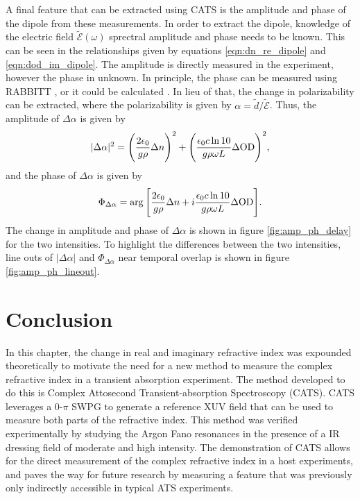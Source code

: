 A final feature that can be extracted using CATS is the amplitude and phase of the dipole from these measurements.  In order to extract the dipole, knowledge of the electric field $\tilde{\mathcal{E}}(\omega)$ sprectral amplitude and phase needs to be known.  This can be seen in the relationships given by equations \ref{eqn:dn_re_dipole} and \ref{eqn:dod_im_dipole}.  The amplitude is directly measured in the experiment, however the phase in unknown.  In principle, the phase can be measured using RABBITT \cite{paulObservationTrainAttosecond2001}, or it could be calculated \cite{lewensteinTheoryHighharmonicGeneration1994}.  In lieu of that, the change in polarizability can be extracted, where the polarizability is given by $\alpha=\tilde{d}/\tilde{\mathcal{E}}$.  Thus, the amplitude of $\Delta\alpha$ is given by
\begin{equation}
	\label{eqn:polariz_amp}
	\lvert\Delta\alpha\rvert^2 = \Bigg(\frac{2\epsilon_0}{g\rho}\Delta n\Bigg)^2 + \Bigg( \frac{\epsilon_0 c \ln 10}{g \rho \omega L}\Delta\mathrm{OD} \Bigg)^2,
\end{equation}
and the phase of $\Delta\alpha$ is given by
\begin{equation}
	\label{eqn:polariz_phase}
	\Phi_{\Delta\alpha}=\arg\Bigg[ \frac{2\epsilon_0}{g\rho}\Delta n  + i \frac{\epsilon_0 c \ln 10}{g \rho \omega L}\Delta\mathrm{OD}\Bigg].
\end{equation}
The change in amplitude and phase of $\Delta\alpha$ is shown in figure \ref{fig:amp_ph_delay} for the two intensities.  To highlight the differences between the two intensities, line outs of $\lvert\Delta\alpha\rvert$ and $\Phi_{\Delta\alpha}$ near temporal overlap is shown in figure \ref{fig:amp_ph_lineout}.  




\section{Conclusion}
\label{sec:CATS_conclusion}
In this chapter, the change in real and imaginary refractive index was expounded theoretically to motivate the need for a new method to measure the complex refractive index in a transient absorption experiment.  The method developed to do this is Complex Attosecond Transient-absorption Spectroscopy (CATS).  CATS leverages a 0-$\pi$ SWPG to generate a reference XUV field that can be used to measure both parts of the refractive index.  This method was verified experimentally by studying the Argon Fano resonances in the presence of a IR dressing field of moderate and high intensity.  The demonstration of CATS allows for the direct measurement of the complex refractive index in a host experiments, and paves the way for future research by measuring a feature that was previously only indirectly accessible in typical ATS experiments. 


